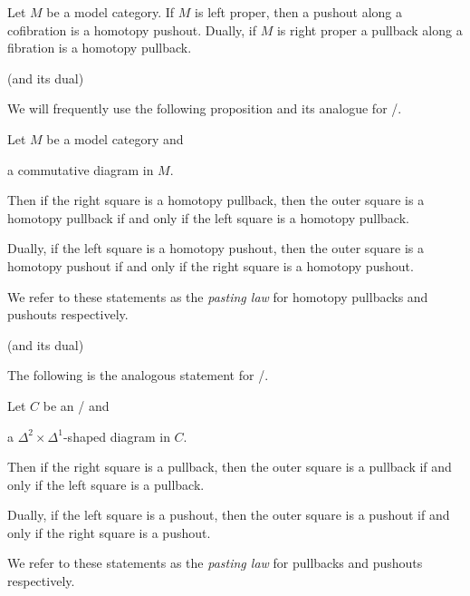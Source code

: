 \begin{prop}
    Let $M$ be a model category.
    If $M$ is left proper, then a pushout along a cofibration is a homotopy pushout.
    Dually, if $M$ is right proper a pullback along a fibration is a homotopy pullback.
    \begin{reference}
        \cite[Proposition A.2.4.4]{HTT} (and its dual)
    \end{reference}
\end{prop}
We will frequently use the following proposition and its analogue for \inftycats/.
\begin{prop}\label{prop:pastingLaw}
    Let $M$ be a model category and 
    \begin{center}
    \end{center}
    a commutative diagram in $M$.

    Then if the right square is a homotopy pullback, then the outer square is a homotopy pullback if and only if the left square is a homotopy pullback.

    Dually, if the left square is a homotopy pushout, then the outer square is a homotopy pushout if and only if the right square is a homotopy pushout.

    We refer to these statements as the \emph{pasting law} for homotopy pullbacks and pushouts respectively.
    \begin{reference}
        \cite[Proposition 8]{models_of_htpy_limits} (and its dual)
    \end{reference}
\end{prop}
The following is the analogous statement for \inftycats/.
\begin{prop}
    Let $C$ be an \inftycat/ and 
    \begin{center}
    \end{center}
    a $\Delta^2\times\Delta^1$-shaped diagram in $C$.

    Then if the right square is a pullback, then the outer square is a pullback if and only if the left square is a pullback.

    Dually, if the left square is a pushout, then the outer square is a pushout if and only if the right square is a pushout.

    We refer to these statements as the \emph{pasting law} for pullbacks and pushouts respectively.
    \begin{reference}
        \cite[Proposition 7.6.3.16]{kerodon}
    \end{reference}
\end{prop}
